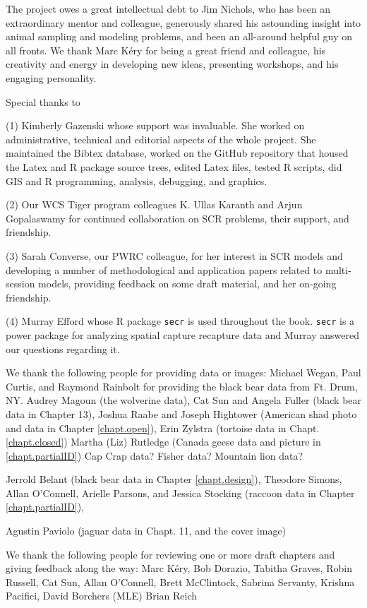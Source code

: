 
The project owes a great intellectual debt to Jim Nichols, who has
been an extraordinary mentor and colleague, generously shared his
astounding insight into animal sampling and modeling problems, and
been an all-around helpful guy on all fronts.  We thank Marc K\'{e}ry
for being a great friend and colleague, his creativity and energy in
developing new ideas, presenting workshops, and his engaging
personality.

Special thanks to

(1) Kimberly Gazenski whose support was invaluable. She worked on
administrative, technical and editorial aspects of the whole
project. She maintained the Bibtex database, worked on the GitHub
repository that housed the Latex and R package source trees, edited
Latex files, tested R scripts, did GIS and R programming, analysis,
debugging, and graphics.

(2) Our WCS Tiger program colleagues K. Ullas Karanth and Arjun
Gopalaswamy for continued collaboration on SCR problems, their
support, and friendship.

(3) Sarah Converse, our PWRC colleague, for her interest in SCR
models and developing a number of methodological and application
papers related to multi-session models, providing feedback on some
draft material, and her on-going friendship.

(4) Murray Efford whose R package \mbox{\tt secr} is used throughout the book.
\mbox{\tt secr} is a power package for analyzing spatial capture recapture data and Murray
answered our questions regarding it.  


\begin{comment}
(4) Murray Efford -- he's the man. He answered most of our emails (but not
all), and he wrote the awesome R package \mbox{\tt secr} (note to Murray: this
is not a sarcastic remark).
\end{comment}


We thank the following people for providing data or images:
Michael Wegan, Paul Curtis, and Raymond Rainbolt for providing the black bear data from Ft. Drum, NY. 
Audrey Magoun (the wolverine data), 
Cat Sun and Angela Fuller (black bear data in Chapter 13),
Joshua Raabe and Joseph Hightower (American shad photo and data in Chapter \ref{chapt.open}),
Erin Zylstra (tortoise data in Chapt. \ref{chapt.closed})
Martha (Liz) Rutledge (Canada geese data and picture in \ref{chapt.partialID})
Cap Crap data? Fisher data?  Mountain lion data?

Jerrold Belant (black bear data in Chapter \ref{chapt.design}),
Theodore Simons, Allan O'Connell, Arielle Parsons, and Jessica Stocking (raccoon data in Chapter \ref{chapt.partialID}), 

Agustin Paviolo (jaguar data in Chapt. 11, and the cover image)

We thank the following people for reviewing one or more draft chapters
and giving feedback along the way:
Marc K\'{e}ry, 
Bob Dorazio,
Tabitha Graves,
Robin Russell,
Cat Sun,
Allan O'Connell,
Brett McClintock,
Sabrina Servanty,
Krishna Pacifici,
David Borchers (MLE)
Brian Reich
